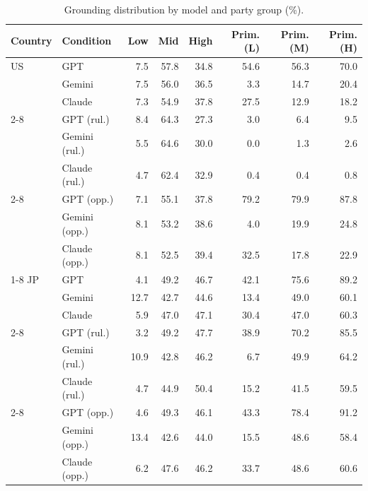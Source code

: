 \begin{table}[t]
\centering
\footnotesize
\setlength{\tabcolsep}{3pt}
\caption{Grounding distribution by model and party group (\%).}
\label{tab:grounding-values}
\begin{tabular}{llrrrrrr}
\toprule
\textbf{Country} & \textbf{Condition} & \textbf{Low} & \textbf{Mid} & \textbf{High} & \textbf{Prim.(L)} & \textbf{Prim.(M)} & \textbf{Prim.(H)} \\
\midrule
US & GPT & 7.5 & 57.8 & 34.8 & 54.6 & 56.3 & 70.0 \\
 & Gemini & 7.5 & 56.0 & 36.5 & 3.3 & 14.7 & 20.4 \\
 & Claude & 7.3 & 54.9 & 37.8 & 27.5 & 12.9 & 18.2 \\
\cmidrule(lr){2-8}
 & GPT (rul.) & 8.4 & 64.3 & 27.3 & 3.0 & 6.4 & 9.5 \\
 & Gemini (rul.) & 5.5 & 64.6 & 30.0 & 0.0 & 1.3 & 2.6 \\
 & Claude (rul.) & 4.7 & 62.4 & 32.9 & 0.4 & 0.4 & 0.8 \\
\cmidrule(lr){2-8}
 & GPT (opp.) & 7.1 & 55.1 & 37.8 & 79.2 & 79.9 & 87.8 \\
 & Gemini (opp.) & 8.1 & 53.2 & 38.6 & 4.0 & 19.9 & 24.8 \\
 & Claude (opp.) & 8.1 & 52.5 & 39.4 & 32.5 & 17.8 & 22.9 \\
\cmidrule(lr){1-8}
JP & GPT & 4.1 & 49.2 & 46.7 & 42.1 & 75.6 & 89.2 \\
 & Gemini & 12.7 & 42.7 & 44.6 & 13.4 & 49.0 & 60.1 \\
 & Claude & 5.9 & 47.0 & 47.1 & 30.4 & 47.0 & 60.3 \\
\cmidrule(lr){2-8}
 & GPT (rul.) & 3.2 & 49.2 & 47.7 & 38.9 & 70.2 & 85.5 \\
 & Gemini (rul.) & 10.9 & 42.8 & 46.2 & 6.7 & 49.9 & 64.2 \\
 & Claude (rul.) & 4.7 & 44.9 & 50.4 & 15.2 & 41.5 & 59.5 \\
\cmidrule(lr){2-8}
 & GPT (opp.) & 4.6 & 49.3 & 46.1 & 43.3 & 78.4 & 91.2 \\
 & Gemini (opp.) & 13.4 & 42.6 & 44.0 & 15.5 & 48.6 & 58.4 \\
 & Claude (opp.) & 6.2 & 47.6 & 46.2 & 33.7 & 48.6 & 60.6 \\
\bottomrule
\end{tabular}
\end{table}
